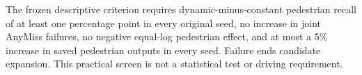 The frozen descriptive criterion requires dynamic-minus-constant pedestrian recall of at least one percentage point in every original seed, no increase in joint AnyMiss failures, no negative equal-log pedestrian effect, and at most a 5\% increase in saved pedestrian outputs in every seed. Failure ends candidate expansion. This practical screen is not a statistical test or driving requirement.

